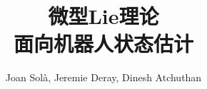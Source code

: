 \documentclass{IEEEtran}
\title{微型Lie理论\\ 面向机器人状态估计}
\author{Joan Sol\`a, Jeremie Deray, Dinesh Atchuthan}
\begin{document}
\maketitle











%


%
%
%
%




\begin{appendices}





\balance


\end{appendices}



\end{document}
